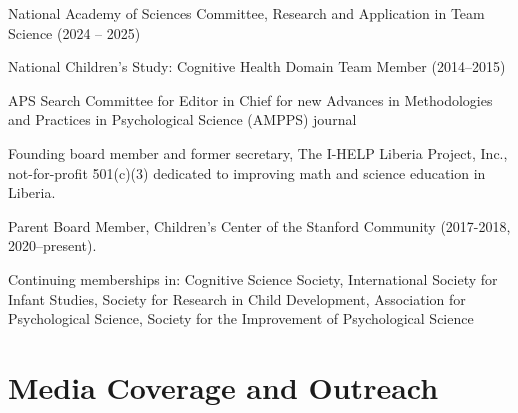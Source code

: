 \documentclass{article}
\renewenvironment{itemize}{
\begin{list}{}{
  \setlength{\leftmargin}{1.5em}
  }
  }{
\end{list}
}
\begin{document}
\begin{itemize}
  \item National Academy of Sciences Committee, Research and Application in Team Science (2024 -- 2025)
  \item National Children's Study: Cognitive Health Domain Team Member (2014--2015)
  \item APS Search Committee for Editor in Chief for new Advances in Methodologies and Practices in Psychological Science (AMPPS) journal
  \item Founding board member and former secretary, The I-HELP Liberia Project, Inc., not-for-profit 501(c)(3) dedicated to improving math and science education in Liberia.
  \item Parent Board Member, Children's Center of the Stanford Community (2017-2018, 2020--present).
  \item Continuing memberships in: Cognitive Science Society, International Society for Infant Studies, Society for Research in Child Development, Association for Psychological Science, Society for the Improvement of Psychological Science
\end{itemize}

\section*{Media Coverage and Outreach}
\end{document}
